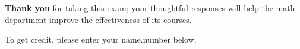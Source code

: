 \documentclass{ximera}
\begin{document}
\textbf{Thank you} for taking this exam; your thoughtful responses
will help the math department improve the effectiveness of its
courses.

To get credit, please enter your name.number below.

\begin{question}
\end{question}
\end{document}
